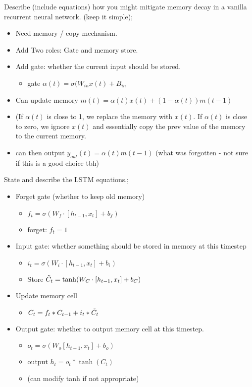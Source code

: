 \documentclass{article}
\begin{document}
Describe (include equations) how you might mitigate memory decay in a vanilla recurrent neural network. (keep it simple); \begin{itemize}
    \item Need memory / copy mechanism. 
    \item Add Two roles: Gate and memory store.
    \item Add gate: whether the current input should be stored.
    \begin{itemize}
        \item gate $\alpha(t) = \sigma(W_{in}x(t)+B_{in}$
    \end{itemize}
    \item Can update memory $m(t) = \alpha(t)x(t) + (1-\alpha(t))m(t-1)$
    \item (If $\alpha(t)$ is close to 1, we replace the memory with $x(t)$. If $\alpha(t)$ is close to zero, we ignore $x(t)$ and essentially copy the prev value of the memory to the current memory.
    \item can then output $y_{out}(t)=\alpha(t)m(t-1)$ (what was forgotten - not sure if this is a good choice tbh)
\end{itemize}

State and describe the LSTM equations.; \begin{itemize}
    \item Forget gate (whether to keep old memory) \begin{itemize}
        \item $f_t = \sigma(W_f \cdot [h_{t-1}, x_t] + b_f)$
        \item forget: $f_t = 1$
    \end{itemize}
    \item Input gate: whether something should be stored in memory at this timestep \begin{itemize}
        \item $i_t = \sigma(W_i \cdot [h_{t-1}, x_t] + b_i)$
        \item Store $\Tilde{C}_t = \tanh(W_C \cdot[h_{t-1}, x_t] + b_C)$
    \end{itemize}
    \item Update memory cell \begin{itemize}
        \item $C_t = f_t * C_{t-1} + i_t * \Tilde{C}_t$
    \end{itemize}
    \item Output gate: whether to output memory cell at this timestep. \begin{itemize}
        \item $o_t = \sigma(W_o[h_{t-1}, x_t] + b_o)$
        \item output $h_t = o_t * \tanh(C_t)$
        \item (can modify tanh if not appropriate)
    \end{itemize}
\end{itemize}
\end{document}
